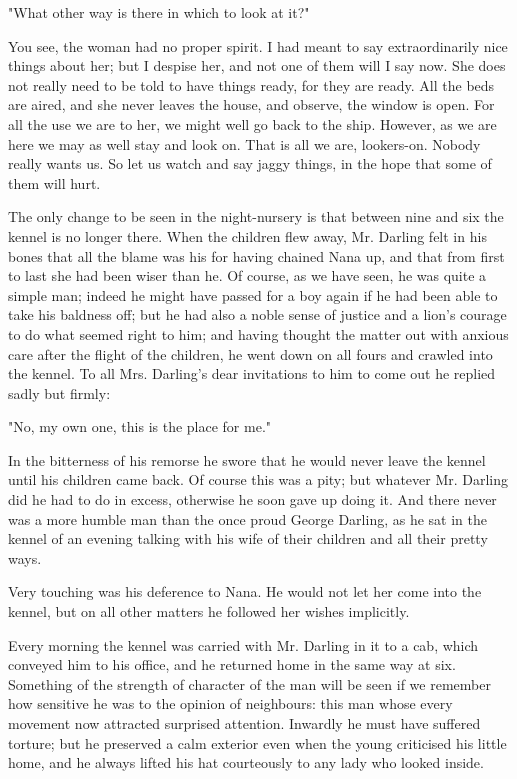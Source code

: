 "What other way is there in which to look at it?"


You see, the woman had no proper spirit. I had meant to say
extraordinarily nice things about her; but I despise her, and not one of
them will I say now. She does not really need to be told to have things
ready, for they are ready. All the beds are aired, and she never leaves
the house, and observe, the window is open. For all the use we are to her,
we might well go back to the ship. However, as we are here we may as well
stay and look on. That is all we are, lookers-on. Nobody really wants us.
So let us watch and say jaggy things, in the hope that some of them will
hurt.


The only change to be seen in the night-nursery is that between nine and
six the kennel is no longer there. When the children flew away, Mr.
Darling felt in his bones that all the blame was his for having chained
Nana up, and that from first to last she had been wiser than he. Of
course, as we have seen, he was quite a simple man; indeed he might have
passed for a boy again if he had been able to take his baldness off; but
he had also a noble sense of justice and a lion's courage to do what
seemed right to him; and having thought the matter out with anxious care
after the flight of the children, he went down on all fours and crawled
into the kennel. To all Mrs. Darling's dear invitations to him to come out
he replied sadly but firmly:


"No, my own one, this is the place for me."


In the bitterness of his remorse he swore that he would never leave the
kennel until his children came back. Of course this was a pity; but
whatever Mr. Darling did he had to do in excess, otherwise he soon gave up
doing it. And there never was a more humble man than the once proud George
Darling, as he sat in the kennel of an evening talking with his wife of
their children and all their pretty ways.


Very touching was his deference to Nana. He would not let her come into
the kennel, but on all other matters he followed her wishes implicitly.


Every morning the kennel was carried with Mr. Darling in it to a cab,
which conveyed him to his office, and he returned home in the same way at
six. Something of the strength of character of the man will be seen if we
remember how sensitive he was to the opinion of neighbours: this man whose
every movement now attracted surprised attention. Inwardly he must have
suffered torture; but he preserved a calm exterior even when the young
criticised his little home, and he always lifted his hat courteously to
any lady who looked inside.



